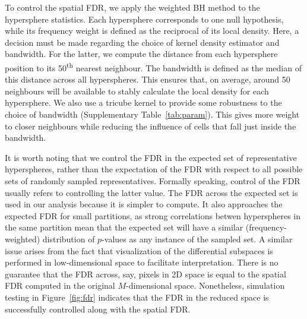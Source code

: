 \documentclass{article}
\begin{document}
To control the spatial FDR, we apply the weighted BH method to the hypersphere statistics.
Each hypersphere corresponds to one null hypothesis, while its frequency weight is defined as the reciprocal of its local density.
Here, a decision must be made regarding the choice of kernel density estimator and bandwidth.
For the latter, we compute the distance from each hypersphere position to its 50\textsuperscript{th} nearest neighbour.
The bandwidth is defined as the median of this distance across all hyperspheres.
This ensures that, on average, around 50 neighbours will be available to stably calculate the local density for each hypersphere.
We also use a tricube kernel to provide some robustness to the choice of bandwidth (Supplementary Table~\ref{tab:param}).
This gives more weight to closer neighbours while reducing the influence of cells that fall just inside the bandwidth.

It is worth noting that we control the FDR in the expected set of representative hyperspheres, rather than the expectation of the FDR with respect to all possible sets of randomly sampled representatives.
Formally speaking, control of the FDR usually refers to controlling the latter value.
The FDR across the expected set is used in our analysis because it is simpler to compute.
It also approaches the expected FDR for small partitions, as strong correlations betwen hyperspheres in the same partition mean that the expected set will have a similar (frequency-weighted) distribution of $p$-values as any instance of the sampled set.
A similar issue arises from the fact that visualization of the differential subspaces is performed in low-dimensional space to facilitate interpretation.
There is no guarantee that the FDR across, say, pixels in 2D space is equal to the spatial FDR computed in the original $M$-dimensional space.
Nonetheless, simulation testing in Figure~\ref{fig:fdr} indicates that the FDR in the reduced space is successfully controlled along with the spatial FDR.

\newcommand{\hi}{\textsuperscript{high}}
\newcommand{\lo}{\textsuperscript{low}}
\end{document}
